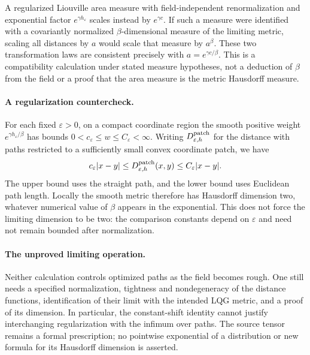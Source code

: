 \documentclass[11pt]{article}
\begin{document}
A regularized Liouville area measure with field-independent renormalization and exponential factor $e^{\gamma h_\varepsilon}$ scales instead by $e^{\gamma c}$. If such a measure were identified with a covariantly normalized $\beta$-dimensional measure of the limiting metric, scaling all distances by $a$ would scale that measure by $a^\beta$. These two transformation laws are consistent precisely with $a=e^{\gamma c/\beta}$. This is a compatibility calculation under stated measure hypotheses, not a deduction of $\beta$ from the field or a proof that the area measure is the metric Hausdorff measure.

\paragraph{A regularization countercheck.}
For each fixed $\varepsilon>0$, on a compact coordinate region the smooth positive weight $e^{\gamma h_\varepsilon/\beta}$ has bounds $0<c_\varepsilon\leq w\leq C_\varepsilon<\infty$. Writing $D^{\rm patch}_{\varepsilon,h}$ for the distance with paths restricted to a sufficiently small convex coordinate patch, we have
\[
 c_\varepsilon|x-y|\leq D^{\rm patch}_{\varepsilon,h}(x,y)
 \leq C_\varepsilon|x-y|.
\]
The upper bound uses the straight path, and the lower bound uses Euclidean path length. Locally the smooth metric therefore has Hausdorff dimension two, whatever numerical value of $\beta$ appears in the exponential. This does not force the limiting dimension to be two: the comparison constants depend on $\varepsilon$ and need not remain bounded after normalization.

\paragraph{The unproved limiting operation.}
Neither calculation controls optimized paths as the field becomes rough. One still needs a specified normalization, tightness and nondegeneracy of the distance functions, identification of their limit with the intended LQG metric, and a proof of its dimension. In particular, the constant-shift identity cannot justify interchanging regularization with the infimum over paths. The source tensor remains a formal prescription; no pointwise exponential of a distribution or new formula for its Hausdorff dimension is asserted.
\end{document}
